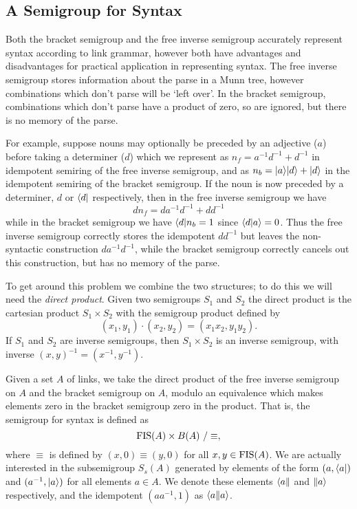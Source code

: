 \documentclass[12pt]{report}
\begin{document}


\subsection{A Semigroup for Syntax}

Both the bracket semigroup and the free inverse semigroup accurately represent syntax according to link grammar, however both have advantages and disadvantages for practical application in representing syntax. The free inverse semigroup stores information about the parse in a Munn tree, however combinations which don't parse will be `left over'. In the bracket semigroup, combinations which don't parse have a product of zero, so are ignored, but there is no memory of the parse.

For example, suppose nouns may optionally be preceded by an adjective ($a$) before taking a determiner ($d$) which we represent as $n_f = a^{-1}d^{-1} + d^{-1}$ in idempotent semiring of the free inverse semigroup, and as $n_b = |a \rangle|d \rangle + |d \rangle$ in the idempotent semiring of the bracket semigroup. If the noun is now preceded by a determiner, $d$ or $\langle d|$ respectively, then in the free inverse semigroup we have
$$dn_f = da^{-1}d^{-1} + dd^{-1}$$
while in the bracket semigroup we have $\langle d|n_b = 1$ since $\langle d| a\rangle = 0$. Thus the free inverse semigroup correctly stores the idempotent $dd^{-1}$ but leaves the non-syntactic construction $da^{-1}d^{-1}$, while the bracket semigroup correctly cancels out this construction, but has no memory of the parse.

To get around this problem we combine the two structures; to do this we will need the \emph{direct product}. Given two semigroups $S_1$ and $S_2$ the direct product is the cartesian product $S_1 \times S_2$ with the semigroup product defined by
$$ (x_1,y_1)\cdot (x_2,y_2) = (x_1x_2,y_1y_2). $$
If $S_1$ and $S_2$ are inverse semigroups, then $S_1 \times S_2$ is an inverse semigroup, with inverse $(x,y)^{-1} = (x^{-1},y^{-1})$.

Given a set $A$ of links, we take the direct product of the free inverse semigroup on $A$ and the bracket semigroup on $A$, modulo an equivalence which makes elements zero in the bracket semigroup zero in the product. That is, the semigroup for syntax  is defined as
$$\operatorname{FIS}(A) \times B(A)\ / \equiv,$$
where $\equiv$ is defined by $(x,0) \equiv (y,0)$ for all $x,y \in \operatorname{FIS}(A)$. We are actually interested in the subsemigroup $S_s(A)$ generated by elements of the form $(a, \langle a|)$ and $(a^{-1},|a \rangle)$ for all elements $a \in A$. We denote these elements $\langle a\|$ and $\|a \rangle$ respectively, and the idempotent $(aa^{-1},1)$ as $\langle a\| a\rangle$.
\end{document}
